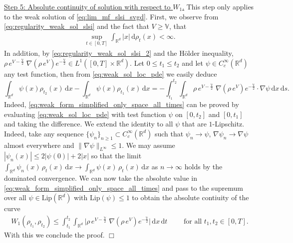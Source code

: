 \documentclass[reqno, 11pt]{amsart}
\numberwithin{equation}{section}
\theoremstyle{definition}
\begin{document}
\underline{Step 5: Absolute continuity of solution with respect to $W_1$.} This step only applies to the weak solution of \eqref{eq:lim_mf_slsi_svgd}. First, we observe from \eqref{eq:regularity_weak_sol_slsi} and the fact that $V\geq \mathbb{V}$, that
\begin{align*}
    \sup_{t\in [0,T]}\int_{\mathbb{R}^{d}} |x|\,\mathrm{d} \rho_t(x)
    <\infty.
\end{align*}
In addition, by \eqref{eq:regularity_weak_sol_slsi_2} and the H\"older inequality, $\rho \, e^{V-\frac{\mathbb{V}}{2}}\; \nabla (\rho \, e^V)e^{-\frac{\mathbb{V}}{2}}\in L^1([0,T]\times\mathbb{R}^{d})$. Let $0\leq t_1 \leq t_2$ and let $\psi\in C_c^\infty(\mathbb{R}^{d})$ any test function, then from \eqref{eq:weak_sol_loc_pde} we easily deduce
\begin{equation}\label{eq:weak_form_simplified_only_space_all_times}
    \int_{\mathbb{R}^{d}}\psi(x) \rho_{t_2}(x) \,\mathrm{d} x - \int_{\mathbb{R}^{d}}\psi(x) \rho_{t_1}(x) \,\mathrm{d} x=
    -\int_{t_1}^{t_2} \int_{\mathbb{R}^{d}} \rho \,e^{V-\frac{\mathbb{V}}{2}}\; \nabla (\rho\, e^V)e^{-\frac{\mathbb{V}}{2}}\cdot \nabla \psi\,\mathrm{d} x\,\mathrm{d} s.
\end{equation}
Indeed, \eqref{eq:weak_form_simplified_only_space_all_times} can be proved by evaluating \eqref{eq:weak_sol_loc_pde} with test function $\psi$ on $[0,t_2]$ and $[0,t_1]$ and taking the difference. We extend the identity to all $\psi$ that are $1$-Lipschitz. Indeed, take any sequence $\{\psi_n\}_{n\geq 1} \subset C_c^{\infty}(\mathbb{R}^{d})$ such that $\psi_n\rightarrow\psi$, $\nabla\psi_n\rightarrow\nabla\psi$ almost everywhere and $\|\nabla\psi\|_{L^\infty}\leq 1$. We may assume $|\psi_n(x)|\leq 2|\psi(0)|+2|x|$ so that the limit $\int_{\mathbb{R}^{d}}\psi_n(x)\, \rho_{t}(x) \,\mathrm{d} x \to \int_{\mathbb{R}^{d}}\psi(x)\, \rho_{t}(x) \,\mathrm{d} x$ as $n\to\infty$ holds by the dominated convergence. We can now take the absolute value in \eqref{eq:weak_form_simplified_only_space_all_times} and pass to the supremum over all $\psi\in \mathrm{Lip}(\mathbb{R}^{d})$ with $\mathrm{Lip}(\psi)\leq 1$ to obtain the absolute contiuity of the curve
\begin{align*}
    W_1(\rho_{t_1},\rho_{t_2})
    \leq \int_{t_1}^{t_2} \int_{\mathbb{R}^{d}} \big\vert \rho\, e^{V-\frac{\mathbb{V}}{2}}\; \nabla (\rho\, e^V)e^{-\frac{\mathbb{V}}{2}} \big\vert \,\mathrm{d} x \,\mathrm{d} t \qquad \mbox{ for all } t_1, t_2 \in [0,T].
\end{align*}
With this we conclude the proof. \hfill $\Box$
\end{document}
